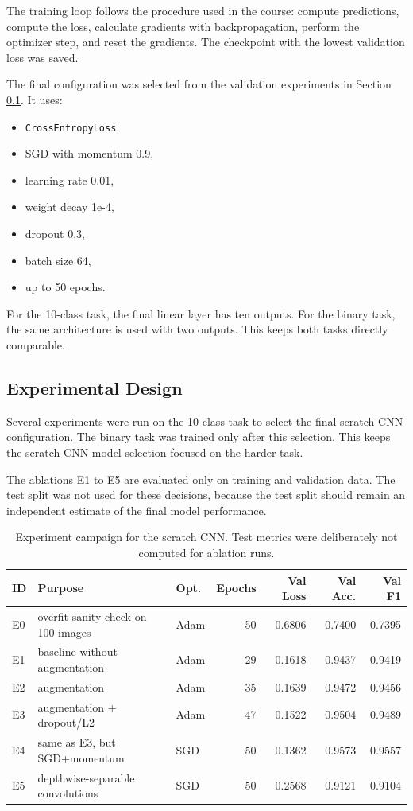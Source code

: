 The training loop follows the procedure used in the course: compute
predictions, compute the loss, calculate gradients with backpropagation,
perform the optimizer step, and reset the gradients. The checkpoint with the
lowest validation loss was saved.

The final configuration was selected from the validation experiments in
Section \ref{sec:model1_experiments}. It uses:

\begin{itemize}
  \item \texttt{CrossEntropyLoss},
  \item SGD with momentum 0.9,
  \item learning rate 0.01,
  \item weight decay 1e-4,
  \item dropout 0.3,
  \item batch size 64,
  \item up to 50 epochs.
\end{itemize}

For the 10-class task, the final linear layer has ten outputs. For the binary
task, the same architecture is used with two outputs. This keeps both tasks
directly comparable.

\subsection{Experimental Design}
\label{sec:model1_experiments}

Several experiments were run on the 10-class task to select the final scratch
CNN configuration. The binary task was trained only after this selection. This
keeps the scratch-CNN model selection focused on the harder task.

The ablations E1 to E5 are evaluated only on training and validation data. The
test split was not used for these decisions, because the test split should
remain an independent estimate of the final model performance.

\begin{table}[H]
\centering
\caption{Experiment campaign for the scratch CNN. Test metrics were deliberately
not computed for ablation runs.}
\label{tab:experiments}
\small
\begin{tabularx}{\textwidth}{lXlrrrr}
\toprule
ID & Purpose & Opt. & Epochs & Val Loss & Val Acc. & Val F1 \\
\midrule
E0 & overfit sanity check on 100 images & Adam & 50 & 0.6806 & 0.7400 & 0.7395 \\
E1 & baseline without augmentation & Adam & 29 & 0.1618 & 0.9437 & 0.9419 \\
E2 & augmentation & Adam & 35 & 0.1639 & 0.9472 & 0.9456 \\
E3 & augmentation + dropout/L2 & Adam & 47 & 0.1522 & 0.9504 & 0.9489 \\
E4 & same as E3, but SGD+momentum & SGD & 50 & 0.1362 & 0.9573 & 0.9557 \\
E5 & depthwise-separable convolutions & SGD & 50 & 0.2568 & 0.9121 & 0.9104 \\
\bottomrule
\end{tabularx}
\end{table}

